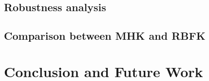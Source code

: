 \documentclass[3p]{elsarticle}
\theoremstyle{problemstyle}
\begin{document}
\subsection{Robustness analysis}


\subsection{Comparison between MHK and RBFK}


\section{Conclusion and Future Work}





\end{document}
